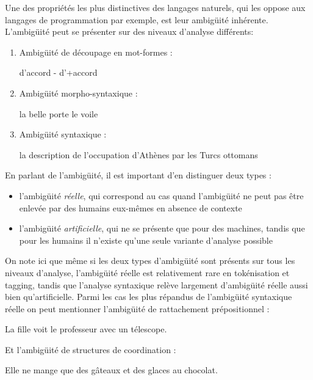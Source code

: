 \documentclass[12pt]{article}
\begin{document}
Une des propri\'et\'es les plus distinctives des langages naturels, qui les
oppose aux langages de programmation par exemple, est leur ambig\"uit\'e inh\'erente. L'ambig\"uit\'e peut se pr\'esenter sur des niveaux d'analyse diff\'erents:

\begin{enumerate}
\item Ambig\"uit\'e de d\'ecoupage en mot-formes :
\begin{exe}
\ex d'accord - d'+accord
\end{exe}
\item Ambig\"uit\'e morpho-syntaxique :
\begin{exe}
\ex la belle porte le voile
\end{exe}
\item Ambig\"uit\'e syntaxique :
\begin{exe}
\ex la description de l'occupation d'Ath\`enes par les Turcs ottomans
\end{exe}
\end{enumerate}


En parlant de l'ambig\"uit\'e, il est important d'en distinguer deux types :
\begin{itemize}
  \item l'ambig\"uit\'e \emph{r\'eelle}, qui correspond au cas quand l'ambig\"uit\'e
ne peut pas \^etre enlev\'ee par des humains eux-m\^emes en absence de contexte
\item l'ambig\"uit\'e \emph{artificielle}, qui ne se pr\'esente que pour des machines,
tandis que pour les humains il n'existe qu'une seule variante d'analyse possible
\end{itemize}

On note ici que m\^eme si les deux types d'ambig\"uit\'e sont pr\'esents sur tous les niveaux d'analyse, 
l'ambig\"uit\'e r\'eelle est relativement rare en tok\'enisation et tagging, tandis que l'analyse syntaxique
rel\`eve largement d'ambig\"uit\'e r\'eelle aussi bien qu'artificielle. Parmi les cas les plus r\'epandus 
de l'ambig\"uit\'e syntaxique r\'eelle on peut mentionner l'ambig\"uit\'e de rattachement pr\'epositionnel :

\begin{exe}
\ex La fille voit le professeur avec un t\'elescope.
\end{exe}

Et l'ambig\"uit\'e de structures de coordination :

\begin{exe}
\ex Elle ne mange que des g\^ateaux et des glaces au chocolat.
\end{exe}
\end{document}

